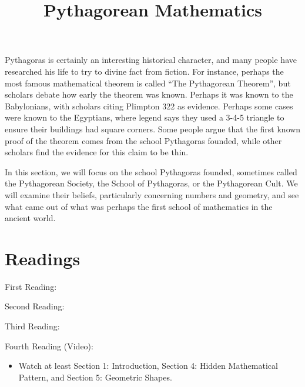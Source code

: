 \documentclass{ximera}
\title{Pythagorean Mathematics}
\begin{document}
\begin{abstract}
\end{abstract}
\maketitle

Pythagoras is certainly an interesting historical character, and many people have researched his life to try to divine fact from fiction.  For instance, perhaps the most famous mathematical theorem is called ``The Pythagorean Theorem'', but scholars debate how early the theorem was known.  Perhaps it was known to the Babylonians, with scholars citing Plimpton 322 as evidence.  Perhaps some cases were known to the Egyptians, where legend says they used a 3-4-5 triangle to ensure their buildings had square corners.  Some people argue that the first known proof of the theorem comes from the school Pythagoras founded, while other scholars find the evidence for this claim to be thin.  

In this section, we will focus on the school Pythagoras founded, sometimes called the Pythagorean Society, the School of Pythagoras, or the Pythagorean Cult.  We will examine their beliefs, particularly concerning numbers and geometry, and see what came out of what was perhaps the first school of mathematics in the ancient world.




\section{Readings}


First Reading: 

Second Reading: 

Third Reading: 

Fourth Reading (Video): 
\begin{itemize}
	\item Watch at least Section 1: Introduction, Section 4: Hidden Mathematical Pattern, and Section 5: Geometric Shapes.
\end{itemize}
\end{document}
